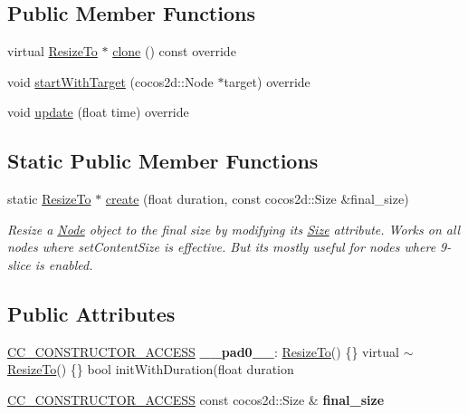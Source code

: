 \subsection*{Public Member Functions}
\begin{DoxyCompactItemize}
\item 
virtual \hyperlink{classResizeTo}{Resize\+To} $\ast$ \hyperlink{classResizeTo_a187ae9350810bc93ec2407b29103ac8c}{clone} () const override
\item 
void \hyperlink{classResizeTo_a7fb76b25f5dbf258bdafaa615f13a05b}{start\+With\+Target} (cocos2d\+::\+Node $\ast$target) override
\item 
void \hyperlink{classResizeTo_a081502ef533e7de8e4c53e8e0e7a1412}{update} (float time) override
\end{DoxyCompactItemize}
\subsection*{Static Public Member Functions}
\begin{DoxyCompactItemize}
\item 
static \hyperlink{classResizeTo}{Resize\+To} $\ast$ \hyperlink{classResizeTo_a3e41f0c44b3f0349ca041947f4f0b12e}{create} (float duration, const cocos2d\+::\+Size \&final\+\_\+size)
\begin{DoxyCompactList}\small\item\em Resize a \hyperlink{classNode}{Node} object to the final size by modifying it\textquotesingle{}s \hyperlink{classSize}{Size} attribute. Works on all nodes where set\+Content\+Size is effective. But it\textquotesingle{}s mostly useful for nodes where 9-\/slice is enabled. \end{DoxyCompactList}\end{DoxyCompactItemize}
\subsection*{Public Attributes}
\begin{DoxyCompactItemize}
\item 
\mbox{\label{classResizeTo_a42800f7e3789c290422d8f95f7e329f7}} 
\hyperlink{_2cocos2d_2cocos_2base_2ccConfig_8h_a25ef1314f97c35a2ed3d029b0ead6da0}{C\+C\+\_\+\+C\+O\+N\+S\+T\+R\+U\+C\+T\+O\+R\+\_\+\+A\+C\+C\+E\+SS} {\bfseries \+\_\+\+\_\+pad0\+\_\+\+\_\+}\+: \hyperlink{classResizeTo}{Resize\+To}() \{\} virtual $\sim$\hyperlink{classResizeTo}{Resize\+To}() \{\} bool init\+With\+Duration(float duration
\item 
\mbox{\label{classResizeTo_a1b88b823c165cd5e8c7fd5c9e945bc7b}} 
\hyperlink{_2cocos2d_2cocos_2base_2ccConfig_8h_a25ef1314f97c35a2ed3d029b0ead6da0}{C\+C\+\_\+\+C\+O\+N\+S\+T\+R\+U\+C\+T\+O\+R\+\_\+\+A\+C\+C\+E\+SS} const cocos2d\+::\+Size \& {\bfseries final\+\_\+size}
\end{DoxyCompactItemize}

